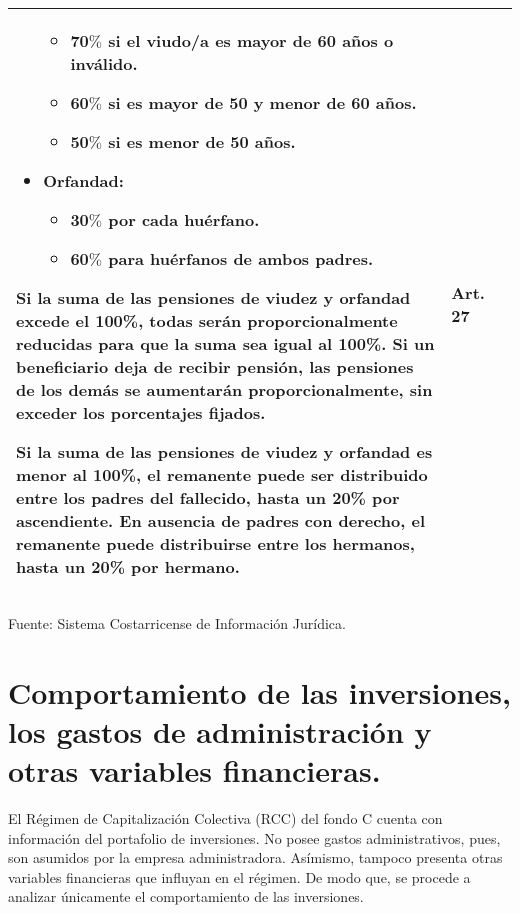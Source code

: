 \documentclass[
]{article}
\begin{document}
\begin{longtable}{|m{4cm}|m{10cm}|m{1.3cm}|}
\begin{itemize}
    \begin{itemize}
        \item 70$\%$ si el viudo/a es mayor de 60 años o inválido.
        \item 60$\%$ si es mayor de 50 y menor de 60 años.
        \item 50$\%$ si es menor de 50 años.
    \end{itemize}
    \item Orfandad:
    \begin{itemize}
        \item 30$\%$ por cada huérfano.
        \item 60$\%$ para huérfanos de ambos padres.
    \end{itemize}
\end{itemize}

Si la suma de las pensiones de viudez y orfandad excede el 100\%, todas serán proporcionalmente reducidas para que la suma sea igual al 100\%. Si un beneficiario deja de recibir pensión, las pensiones de los demás se aumentarán proporcionalmente, sin exceder los porcentajes fijados.

Si la suma de las pensiones de viudez y orfandad es menor al 100\%, el remanente puede ser distribuido entre los padres del fallecido, hasta un 20\% por ascendiente. En ausencia de padres con derecho, el remanente puede distribuirse entre los hermanos, hasta un 20\% por hermano.& Art. 27 \\
\hline
\end{longtable}
\endgroup
\captionsetup{font=footnotesize} 
\begin{center}
\captionsetup{type=table} 
\caption*{\footnotesize Fuente: Sistema Costarricense de Información Jurídica.}
\end{center}

\section{Comportamiento de las inversiones, los gastos de administración
y otras variables
financieras.}\label{comportamiento-de-las-inversiones-los-gastos-de-administraciuxf3n-y-otras-variables-financieras.}

El Régimen de Capitalización Colectiva (RCC) del fondo C cuenta con
información del portafolio de inversiones. No posee gastos
administrativos, pues, son asumidos por la empresa administradora.
Asímismo, tampoco presenta otras variables financieras que influyan en
el régimen. De modo que, se procede a analizar únicamente el
comportamiento de las inversiones.
\end{document}
